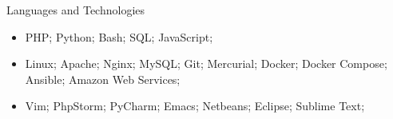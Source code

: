 \documentclass[]{mosabcv}
\begin{document}
	\begin{cvsection}{Languages and Technologies}
		\begin{cvsubsection}{}{}{}	
			\begin{itemize}
				\item PHP; Python; Bash; SQL; JavaScript;
				\item Linux; Apache; Nginx; MySQL; Git; Mercurial; Docker; Docker Compose; Ansible; Amazon Web Services;
				\item Vim; PhpStorm; PyCharm; Emacs; Netbeans; Eclipse; Sublime Text;
			\end{itemize}
		\end{cvsubsection}
	\end{cvsection}
	
\end{document}
